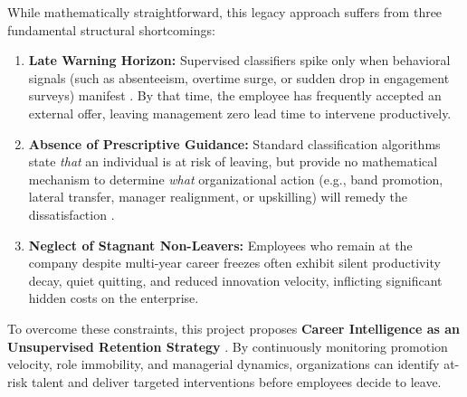 \documentclass[12pt,a4paper,oneside]{article}
\begin{document}
While mathematically straightforward, this legacy approach suffers from three fundamental structural shortcomings:
\begin{enumerate}
  \item \textbf{Late Warning Horizon:} Supervised classifiers spike only when behavioral signals (such as absenteeism, overtime surge, or sudden drop in engagement surveys) manifest \cite{ref_cascio_turnover}. By that time, the employee has frequently accepted an external offer, leaving management zero lead time to intervene productively.
  \item \textbf{Absence of Prescriptive Guidance:} Standard classification algorithms state \textit{that} an individual is at risk of leaving, but provide no mathematical mechanism to determine \textit{what} organizational action (e.g., band promotion, lateral transfer, manager realignment, or upskilling) will remedy the dissatisfaction \cite{ref_bapna_analytics}.
  \item \textbf{Neglect of Stagnant Non-Leavers:} Employees who remain at the company despite multi-year career freezes often exhibit silent productivity decay, quiet quitting, and reduced innovation velocity, inflicting significant hidden costs on the enterprise.
\end{enumerate}

To overcome these constraints, this project proposes \textbf{Career Intelligence as an Unsupervised Retention Strategy} \cite{ref_tambe_ai_hr}. By continuously monitoring promotion velocity, role immobility, and managerial dynamics, organizations can identify at-risk talent and deliver targeted interventions before employees decide to leave.
\end{document}
